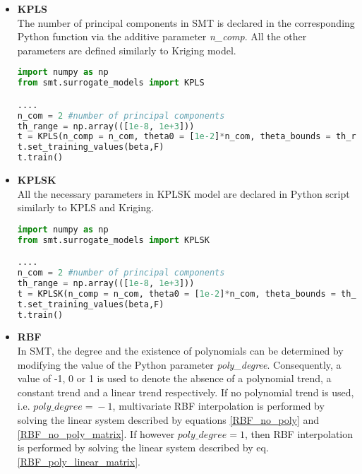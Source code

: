\begin{itemize}
\begin{lstlisting}[language = Python, caption = Training of Kriging model with noisy observations via SMT]
import numpy as np
from smt.surrogate_models import KRG

.... 
ndim = 3 #number of problem dimensions
th_range = np.array(([1e-8, 1e+3]))
t = KRG(theta0 = [1e-2]*ndim, theta_bounds = th_range, poly = 'constant', corr = 'squar_exp', eval_noise = True, noise0 = [1e-2])     
t.set_training_values(beta,F)
t.train()
\end{lstlisting}

\newpage


\item \textbf{KPLS} \\
The number of principal components in SMT is declared 
in the corresponding Python function via the additive 
parameter \textit{n\_comp}. All the other parameters are
defined similarly to Kriging model.

\begin{lstlisting}[language = Python, caption = Training of KPLS model with noisy observations via SMT]
import numpy as np
from smt.surrogate_models import KPLS

.... 
n_com = 2 #number of principal components
th_range = np.array(([1e-8, 1e+3]))
t = KPLS(n_comp = n_com, theta0 = [1e-2]*n_com, theta_bounds = th_range, poly = 'constant', corr = 'squar_exp')    
t.set_training_values(beta,F)
t.train()
\end{lstlisting}

\item \textbf{KPLSK} \\
All the necessary parameters in 
KPLSK model are declared in Python script similarly to 
KPLS and Kriging.

\begin{lstlisting}[language = Python, caption = Training of KPLSK model with noisy observations via SMT]
import numpy as np
from smt.surrogate_models import KPLSK

.... 
n_com = 2 #number of principal components
th_range = np.array(([1e-8, 1e+3]))
t = KPLSK(n_comp = n_com, theta0 = [1e-2]*n_com, theta_bounds = th_range, poly = 'constant', corr = 'squar_exp')    
t.set_training_values(beta,F)
t.train()
\end{lstlisting}

\item \textbf{RBF} \\
In SMT, the degree and the existence of polynomials can be 
determined by modifying the value of the Python parameter 
\textit{poly\_degree}. Consequently, a value of -1, 0 or 1 is used 
to denote the absence of a polynomial trend, a constant trend and 
a linear trend respectively. If no polynomial trend is used, i.e. 
$poly\_degree \!= \!-1$, multivariate RBF interpolation is 
performed by solving the linear system described by equations 
\ref{RBF_no_poly} and \ref{RBF_no_poly_matrix}. If however 
$poly\_degree \!= \!1$, then RBF interpolation is performed by solving the linear system described by eq. 
\ref{RBF_poly_linear_matrix}.


\end{itemize}

